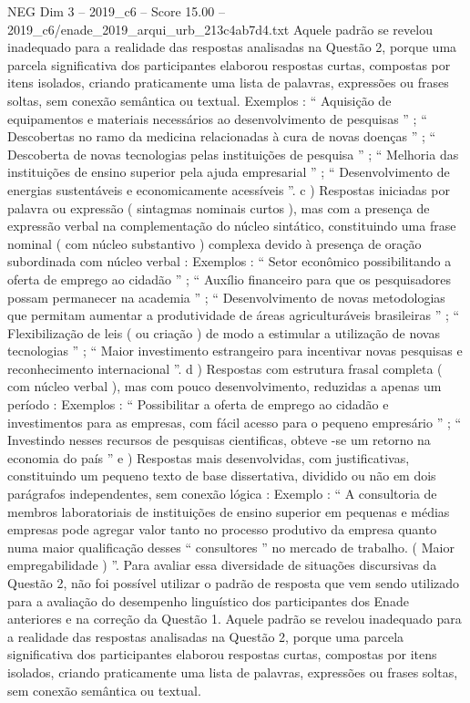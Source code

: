 \begin{textsample}{NEG Dim 3 – 2019\_c6 – Score 15.00 – 2019\_c6/enade\_2019\_arqui\_urb\_213c4ab7d4.txt}
Aquele padrão se revelou inadequado para a realidade das respostas analisadas na Questão 2, porque uma parcela significativa dos participantes elaborou respostas curtas, compostas por itens isolados, criando praticamente uma lista de palavras, expressões ou frases soltas, sem conexão semântica ou textual.
Exemplos : “ Aquisição de equipamentos e materiais necessários ao desenvolvimento de pesquisas ” ; “ Descobertas no ramo da medicina relacionadas à cura de novas doenças ” ; “ Descoberta de novas tecnologias pelas instituições de pesquisa ” ; “ Melhoria das instituições de ensino superior pela ajuda empresarial ” ; “ Desenvolvimento de energias sustentáveis e economicamente acessíveis ”. c ) Respostas iniciadas por palavra ou expressão ( sintagmas nominais curtos ), mas com a presença de expressão verbal na complementação do núcleo sintático, constituindo uma frase nominal ( com núcleo substantivo ) complexa devido à presença de oração subordinada com núcleo verbal : Exemplos : “ Setor econômico possibilitando a oferta de emprego ao cidadão ” ; “ Auxílio financeiro para que os pesquisadores possam permanecer na academia ” ; “ Desenvolvimento de novas metodologias que permitam aumentar a produtividade de áreas agriculturáveis brasileiras ” ; “ Flexibilização de leis ( ou criação ) de modo a estimular a utilização de novas tecnologias ” ; “ Maior investimento estrangeiro para incentivar novas pesquisas e reconhecimento internacional ”. d ) Respostas com estrutura frasal completa ( com núcleo verbal ), mas com pouco desenvolvimento, reduzidas a apenas um período : Exemplos : “ Possibilitar a oferta de emprego ao cidadão e investimentos para as empresas, com fácil acesso para o pequeno empresário ” ; “ Investindo nesses recursos de pesquisas cientificas, obteve -se um retorno na economia do país ” e ) Respostas mais desenvolvidas, com justificativas, constituindo um pequeno texto de base dissertativa, dividido ou não em dois parágrafos independentes, sem conexão lógica : Exemplo : “ A consultoria de membros laboratoriais de instituições de ensino superior em pequenas e médias empresas pode agregar valor tanto no processo produtivo da empresa quanto numa maior qualificação desses “ consultores ” no mercado de trabalho. ( Maior empregabilidade ) ”.
Para avaliar essa diversidade de situações discursivas da Questão 2, não foi possível utilizar o padrão de resposta que vem sendo utilizado para a avaliação do desempenho linguístico dos participantes dos Enade anteriores e na correção da Questão 1.
Aquele padrão se revelou inadequado para a realidade das respostas analisadas na Questão 2, porque uma parcela significativa dos participantes elaborou respostas curtas, compostas por itens isolados, criando praticamente uma lista de palavras, expressões ou frases soltas, sem conexão semântica ou textual.

\end{textsample}
